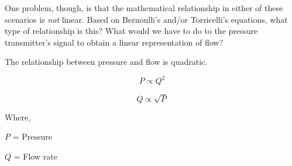 \vskip 10pt

One problem, though, is that the mathematical relationship in either of these scenarios is {\it not} linear.  Based on Bernoulli's and/or Torricelli's equations, what type of relationship is this?  What would we have to do to the pressure transmitter's signal to obtain a linear representation of flow?







The relationship between pressure and flow is quadratic.







$$P \propto Q^2$$

$$Q \propto \sqrt{P}$$

\noindent
Where,

$P$ = Pressure

$Q$ = Flow rate

\vskip 10pt




